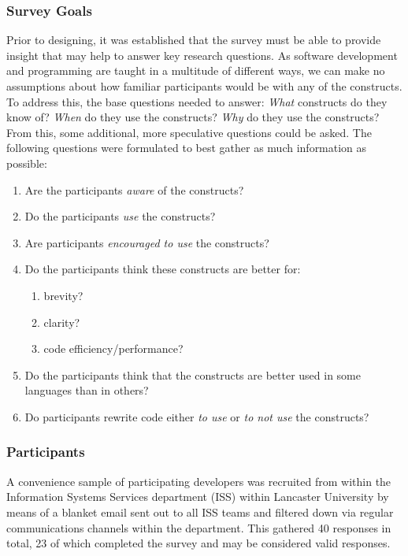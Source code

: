 \documentclass{article}
\begin{document}
        \subsubsection{Survey Goals}
        \label{subsubsec:surveyGoal}
            Prior to designing, it was established that the survey must be able to provide insight that may help to answer key research questions. As software development and programming are taught in a multitude of different ways, we can make no assumptions about how familiar participants would be with any of the constructs. To address this, the base questions needed to answer: \emph{What} constructs do they know of? \emph{When} do they use the constructs? \emph{Why} do they use the constructs? From this, some additional, more speculative questions could be asked. The following questions were formulated to best gather as much information as possible:
            \begin{enumerate}
                \item Are the participants \emph{aware} of the constructs?
                \item Do the participants \emph{use} the constructs?
                \item Are participants \emph{encouraged to use} the constructs?
                \item Do the participants think these constructs are better for:
                \begin{enumerate}
                    \item brevity?
                    \item clarity?
                    \item code efficiency/performance?
                \end{enumerate}  
                \item Do the participants think that the constructs are better used in some languages than in others?
                \item Do participants rewrite code either \emph{to use} or \emph{to not use} the constructs?
            \end{enumerate}
            
        \subsubsection{Participants}
            A convenience sample of participating developers was recruited from within the Information Systems Services department (ISS) within Lancaster University by means of a blanket email sent out to all ISS teams and filtered down via regular communications channels within the department. This gathered 40 responses in total, 23 of which completed the survey and may be considered valid responses.
            
\end{document}
